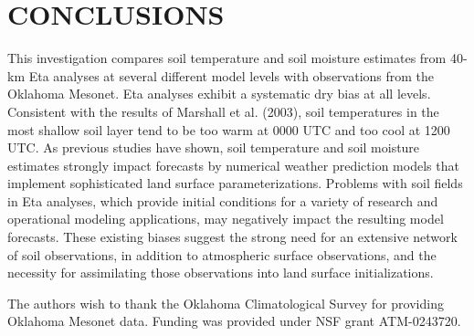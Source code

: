 \documentclass[twocolumn]{article}
\begin{document}
\section{{\normalsize \hspace{-0.195in} {\textbf{
CONCLUSIONS
}}}} \vspace{-1.6mm}
\label{etacomp_conc.sec}
This investigation compares soil temperature and soil moisture estimates from 40-km Eta analyses at several different model levels with observations from the Oklahoma Mesonet.  Eta analyses exhibit a systematic dry bias at all levels.  Consistent with the results of Marshall et al. (2003), soil temperatures in the most shallow soil layer tend to be too warm at 0000 UTC and too cool at 1200 UTC.  As previous studies have shown, soil temperature and soil moisture estimates strongly impact forecasts by numerical weather prediction models that implement sophisticated land surface parameterizations.  Problems with soil fields in Eta analyses, which provide initial conditions for a variety of research and operational modeling applications, may negatively impact the resulting model forecasts.  These existing biases suggest the strong need for an extensive network of soil observations, in addition to atmospheric surface observations, and the necessity for assimilating those observations into land surface initializations.

\begin{acknowledgments}
The authors wish to thank the Oklahoma Climatological Survey for providing Oklahoma Mesonet data.  Funding was provided under NSF grant ATM-0243720.
\end{acknowledgments}

\end{document}
